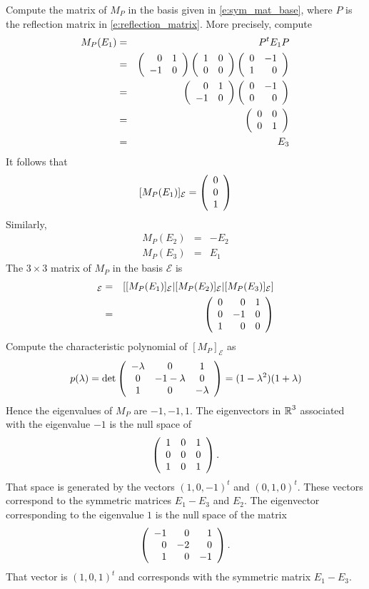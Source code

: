 \documentclass{ximera}
\begin{document}
\begin{exercise}
\begin{solution}
\begin{enumeratea}
\item Compute the matrix of $M_P$ in the basis given in \eqref{e:sym_mat_base}, where $P$ is the reflection matrix in \eqref{e:reflection_matrix}.   More precisely, compute
\begin{eqnarray*}
M_P(E_1) & = & P^t E_1P \\
 & = &    \left(\begin{array}{rrrrrrrrrrrrrrrrrr} 0 & 1 \\ -1 & 0  \end{array}\right) \left(\begin{array}{cccccccccccc} 1 & 0 \\ 0 & 0 \end{array}\right)   \left(\begin{array}{rrrrrrrrrrrrrrrrrr} 0 & -1 \\ 1 & 0  \end{array}\right) \\
 & = &    \left(\begin{array}{rrrrrrrrrrrrrrrrrr} 0 & 1 \\ -1 & 0  \end{array}\right)  \left(\begin{array}{rrrrrrrrrrrrrrrrrr} 0 & -1 \\ 0 & 0  \end{array}\right) \\
 & = & \left(\begin{array}{cccccccccccc} 0 & 0 \\ 0 & 1  \end{array}\right) \\
 & = & E_3
\end{eqnarray*}
It follows that 
\[
[M_P(E_1)]_\mathcal{E} = \left(\begin{array}{cccccccccccc}  0 \\ 0 \\ 1 \end{array}\right)
\]
Similarly,
\begin{eqnarray*}
M_P(E_2) & = & -E_2\\
M_P(E_3) & = & E_1
\end{eqnarray*}
The $3\times 3$ matrix of $M_P$ in the basis $\mathcal{E}$ is 
\begin{eqnarray*}
[M_P]_\mathcal{E} & = & [ [M_P(E_1)]_\mathcal{E} | [M_P(E_2)]_\mathcal{E} |[M_P(E_3)]_\mathcal{E} ] \\
& = &  \Matrix{  0 &  0 & 1 \\  0 & -1 & 0 \\  1 & 0 & 0 }
\end{eqnarray*}
Compute the characteristic polynomial of $[M_P]_\mathcal{E}$ as
\[
p(\lambda)  = \det \left(\begin{array}{cccccccccccc}   -\lambda & 0 &  1 \\ 0 & -1-\lambda & 0 \\ 1 &  0 & -\lambda \end{array}\right) = (1-\lambda^2)(1+\lambda)
\]
Hence the eigenvalues of $M_P$ are $-1,-1,1$. 
The eigenvectors in $\mbox{$\Bbb{R}$}^3$ associated with the eigenvalue $-1$ is the null space of 
\[
\left(\begin{array}{rrrrrrrrrrrrrrrrrr}   1 & 0 &  1 \\ 0 & 0 & 0 \\ 1 &  0 & 1 \end{array}\right) . 
\]
That space is generated by the vectors $(1,0,-1)^t$ and $(0, 1, 0)^t$.   These vectors correspond to the symmetric matrices $E_1-E_3$ and $E_2$.
The eigenvector corresponding to the eigenvalue $1$ is the null space of the matrix 
\[
\left(\begin{array}{rrrrrrrrrrrrrrrrrr}   -1 & 0 &  1 \\ 0 & -2 & 0 \\ 1 &  0 & -1 \end{array}\right) . 
\]
That vector is $(1, 0, 1)^t$ and corresponds with the symmetric matrix $E_1-E_3$.
\end{enumeratea}

\end{solution}
\end{exercise}
\end{document}
